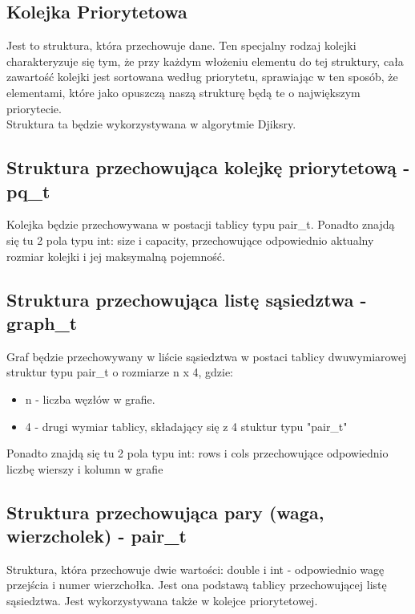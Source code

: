 \documentclass{article}
\begin{document}
\subsection{Kolejka Priorytetowa}
Jest to struktura, która przechowuje dane. Ten specjalny rodzaj kolejki charakteryzuje się tym, że przy każdym włożeniu elementu do tej struktury, cała zawartość kolejki jest sortowana według priorytetu, sprawiając w ten sposób, że elementami, które jako opuszczą naszą strukturę będą te o największym priorytecie.
\\
Struktura ta będzie wykorzystywana w algorytmie Djiksry.
\subsection{Struktura przechowująca kolejkę priorytetową - pq\_t}
Kolejka będzie przechowywana w postacji tablicy typu pair\_t.
Ponadto znajdą się tu 2 pola typu int: size i capacity, przechowujące odpowiednio aktualny rozmiar kolejki i jej maksymalną pojemność.

\subsection{Struktura przechowująca listę sąsiedztwa - graph\_t}
Graf będzie przechowywany w liście sąsiedztwa w postaci tablicy dwuwymiarowej struktur typu pair\_t o rozmiarze n x 4, gdzie:
\begin{itemize}
\item n - liczba węzłów w grafie.
\item 4 - drugi wymiar tablicy, składający się z 4 stuktur typu "pair\_t"
\end{itemize}
Ponadto znajdą się tu 2 pola typu int: rows i cols przechowujące odpowiednio liczbę wierszy i kolumn w grafie
\subsection{Struktura przechowująca pary (waga, wierzcholek) - pair\_t}
Struktura, która przechowuje dwie wartości: double i int - odpowiednio wagę przejścia i numer wierzchołka. Jest ona podstawą tablicy przechowującej listę sąsiedztwa. Jest wykorzystywana także w kolejce priorytetowej. 
\end{document}
